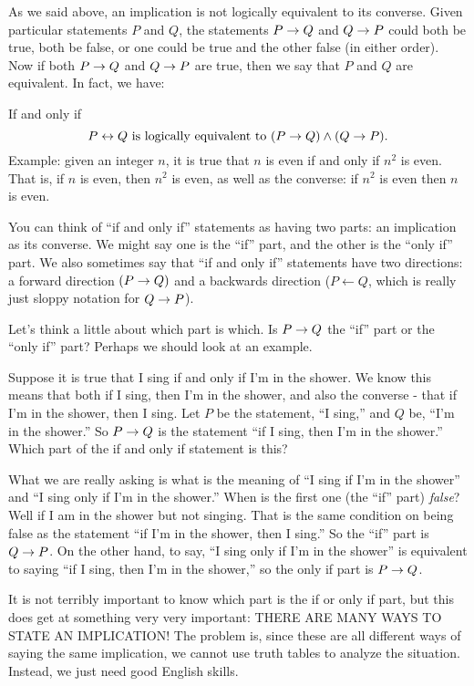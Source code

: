 \documentclass[12pt]{article}
\begin{document}
As we said above, an implication is not logically equivalent to its converse.  Given particular statements $P$ and $Q$, the statements $P \rightarrow Q$ and $Q \rightarrow P$ could both be true, both be false, or one could be true and the other false (in either order).  Now if both $P \rightarrow Q$ and $Q \rightarrow P$ are true, then we say that $P$ and $Q$ are equivalent.  In fact, we have:

\begin{defbox}{If and only if}
\[ P \leftrightarrow Q \mbox{ is logically equivalent to } (P \rightarrow Q) \wedge (Q \rightarrow P).\]
Example: given an integer $n$, it is true that $n$ is even if and only if $n^2$ is even.  That is, if $n$ is even, then $n^2$ is even, as well as the converse: if $n^2$ is even then $n$ is even.
\end{defbox}

You can think of ``if and only if'' statements as having two parts: an implication as its converse.  We might say one is the ``if'' part, and the other is the ``only if'' part.  We also sometimes say that ``if and only if'' statements have two directions: a forward direction $(P \rightarrow Q)$ and a backwards direction ($P \leftarrow Q$, which is really just sloppy notation for $Q \rightarrow P$).  

Let's think a little about which part is which.  Is $P \rightarrow Q$ the ``if'' part or the ``only if'' part?  Perhaps we should look at an example.

\begin{example}
 Suppose it is true that I sing if and only if I'm in the shower.  We know this means that both if I sing, then I'm in the shower, and also the converse - that if I'm in the shower, then I sing.  Let $P$ be the statement, ``I sing,'' and $Q$ be, ``I'm in the shower.''  So $P \rightarrow Q$ is the statement ``if I sing, then I'm in the shower.''  Which part of the if and only if statement is this?
 
 What we are really asking is what is the meaning of ``I sing if I'm in the shower'' and ``I sing only if I'm in the shower.''  When is the first one (the ``if'' part) {\em false}?  Well if I am in the shower but not singing.  That is the same condition on being false as the statement ``if I'm in the shower, then I sing.''  So the ``if'' part is $Q \rightarrow P$.  On the other hand, to say, ``I sing only if I'm in the shower'' is equivalent to saying ``if I sing, then I'm in the shower,'' so the only if part is $P \rightarrow Q$.
\end{example}

It is not terribly important to know which part is the if or only if part, but this does get at something very very important: THERE ARE MANY WAYS TO STATE AN IMPLICATION!  The problem is, since these are all different ways of saying the same implication, we cannot use truth tables to analyze the situation.  Instead, we just need good English skills.
\end{document}
